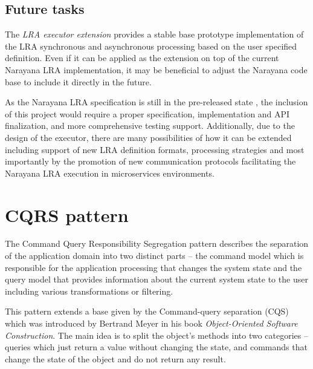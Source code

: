 \documentclass[oneside,
  digital, %
  table,   %
  lof,     %
  lot,     %
]{fithesis3}
\begin{document}
\section{Future tasks}

The \textit{LRA executor extension} provides a stable base prototype implementation of the LRA synchronous and asynchronous processing based on the user specified definition. Even if it can be applied as the extension on top of the current Narayana LRA implementation, it may be beneficial to adjust the Narayana code base to include it directly in the future. 

As the Narayana LRA specification is still in the pre-released state \cite{narayana_lra}, the inclusion of this project would require a proper specification, implementation and API finalization, and more comprehensive testing support. Additionally, due to the design of the executor, there are many possibilities of how it can be extended including support of new LRA definition formats, processing strategies and most importantly by the promotion of new communication protocols facilitating the Narayana LRA execution in microservices environments.

\makeatletter\thesis@blocks@clear\makeatother
{} %
\printindex




\appendix %

\clearpage
\chapter{CQRS pattern}
\label{sec:appendix-cqrs}

The Command Query Responsibility Segregation pattern describes the separation of the application domain into two distinct parts -- the command model which is responsible for the application processing that changes the system state and the query model that provides information about the current system state to the user including various transformations or filtering. 

This pattern extends a base given by the Command-query separation (CQS) which was introduced by Bertrand Meyer in his book \textit{Object-Oriented Software Construction}. The main idea is to split the object's methods into two categories -- queries which just return a value without changing the state, and commands that change the state of the object and do not return any result.
\end{document}
